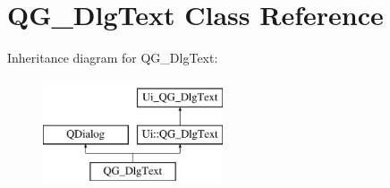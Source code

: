 \hypertarget{classQG__DlgText}{\section{Q\-G\-\_\-\-Dlg\-Text Class Reference}
\label{classQG__DlgText}
}
Inheritance diagram for Q\-G\-\_\-\-Dlg\-Text\-:\begin{figure}[H]
\begin{center}
\leavevmode
\includegraphics[height=3.000000cm]{classQG__DlgText}
\end{center}
\end{figure}
